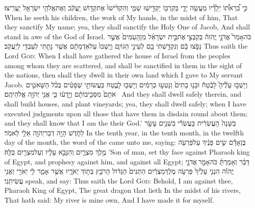 {כִּ֣י בִ֠רְאֹת֠וֹ יְלָדָ֞יו מַעֲשֵׂ֥ה יָדַ֛י בְּקִרְבּ֖וֹ יַקְדִּ֣ישֽׁוּ שְׁמִ֑י וְהִקְדִּ֙ישׁוּ֙ אֶת\maqqaf קְד֣וֹשׁ יַֽעֲקֹ֔ב וְאֶת\maqqaf אֱלֹהֵ֥י יִשְׂרָאֵ֖ל יַעֲרִֽיצוּ׃}
{When he seeth his children, the work of My hands, in the midst of him, That they sanctify My name; yea, they shall sanctify the Holy One of Jacob, And shall stand in awe of the God of Israel.}
\label{haft_14}
\setcounter{chap}{28}
\setcounter{verse}{25}
{כֹּה\maqqaf אָמַר֮ אֲדֹנָ֣י יֱהֹוִה֒ בְּקַבְּצִ֣י \legarmeh  אֶת\maqqaf בֵּ֣ית יִשְׂרָאֵ֗ל מִן\maqqaf הָֽעַמִּים֙ אֲשֶׁ֣ר נָפֹ֣צוּ בָ֔ם וְנִקְדַּ֥שְׁתִּי בָ֖ם לְעֵינֵ֣י הַגּוֹיִ֑ם וְיָֽשְׁבוּ֙ עַל\maqqaf אַדְמָתָ֔ם אֲשֶׁ֥ר נָתַ֖תִּי לְעַבְדִּ֥י לְיַעֲקֹֽב׃}
{Thus saith the Lord \textsc{God}: When I shall have gathered the house of Israel from the peoples among whom they are scattered, and shall be sanctified in them in the sight of the nations, then shall they dwell in their own land which I gave to My servant Jacob.}
{וְיָשְׁב֣וּ עָלֶ֘יהָ֮ לָבֶ֒טַח֒ וּבָנ֤וּ בָתִּים֙ וְנָטְע֣וּ כְרָמִ֔ים וְיָשְׁב֖וּ לָבֶ֑טַח בַּעֲשׂוֹתִ֣י שְׁפָטִ֗ים בְּכֹ֨ל הַשָּׁאטִ֤ים אֹתָם֙ מִסְּבִ֣יבוֹתָ֔ם וְיָ֣דְע֔וּ כִּ֛י אֲנִ֥י יְהֹוָ֖ה אֱלֹהֵיהֶֽם׃ \petucha }
{And they shall dwell safely therein, and shall build houses, and plant vineyards; yea, they shall dwell safely; when I have executed judgments upon all those that have them in disdain round about them; and they shall know that I am the \lord\space their God.’}
\newperek
{}
{בַּשָּׁנָה֙ הָעֲשִׂרִ֔ית בָּעֲשִׂרִ֕י בִּשְׁנֵ֥ים עָשָׂ֖ר לַחֹ֑דֶשׁ הָיָ֥ה דְבַר\maqqaf יְהֹוָ֖ה אֵלַ֥י לֵאמֹֽר׃}
{In the tenth year, in the tenth month, in the twelfth day of the month, the word of the \lord\space came unto me, saying:}
{בֶּן\maqqaf אָדָ֕ם שִׂ֣ים פָּנֶ֔יךָ עַל\maqqaf פַּרְעֹ֖ה מֶ֣לֶךְ מִצְרָ֑יִם וְהִנָּבֵ֣א עָלָ֔יו וְעַל\maqqaf מִצְרַ֖יִם כֻּלָּֽהּ׃}
{’Son of man, set thy face against Pharaoh king of Egypt, and prophesy against him, and against all Egypt;}
{דַּבֵּ֨ר וְאָמַרְתָּ֜ כֹּה\maqqaf אָמַ֣ר \legarmeh  אֲדֹנָ֣י יֱהֹוִ֗ה הִנְנִ֤י עָלֶ֙יךָ֙ פַּרְעֹ֣ה מֶלֶךְ\maqqaf מִצְרַ֔יִם הַתַּנִּים֙ הַגָּד֔וֹל הָרֹבֵ֖ץ בְּת֣וֹךְ יְאֹרָ֑יו אֲשֶׁ֥ר אָמַ֛ר לִ֥י יְאֹרִ֖י וַאֲנִ֥י עֲשִׂיתִֽנִי׃}
{speak, and say: Thus saith the Lord \textsc{God}: Behold, I am against thee, Pharaoh King of Egypt, The great dragon that lieth In the midst of his rivers, That hath said: My river is mine own, And I have made it for myself.}
